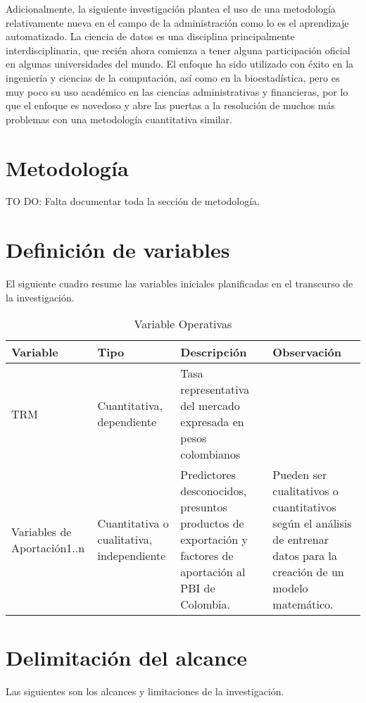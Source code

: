 Adicionalmente, la siguiente investigación plantea el uso de una metodología relativamente nueva en el campo de la administración como lo es el aprendizaje automatizado. La ciencia de datos es una disciplina principalmente interdisciplinaria, que recién ahora comienza a tener alguna participación oficial en algunas universidades del mundo. El enfoque ha sido utilizado con éxito en la ingeniería y ciencias de la computación, así como en la bioestadística, pero es muy poco su uso académico en las ciencias administrativas y financieras, por lo que el enfoque es novedoso y abre las puertas a la resolución de muchos más problemas con una metodología cuantitativa similar. 

\section{Metodología}
TO DO: Falta documentar toda la sección de metodología. 

\section{Definición de variables}
El siguiente cuadro resume las variables iniciales planificadas en el transcurso de la investigación.

\begin{table}[h]
\begin{tabular}{m{1.0in} m{1.0in} m{1.5in} m{1.5in}}
\textbf{Variable} & Tipo & Descripción & Observación \\ \hline
TRM & Cuantitativa, dependiente & Tasa representativa del mercado expresada en pesos colombianos &  \\ \hline
Variables de Aportación1..n & Cuantitativa o cualitativa, independiente & Predictores desconocidos, presuntos productos de exportación y factores de aportación al PBI de Colombia. & Pueden ser cualitativos o cuantitativos según el análisis de entrenar datos para la creación de un modelo matemático.
\end{tabular}

\caption{Variable Operativas}
\label{my-label}
\end{table}

\section{Delimitación del alcance}
Las siguientes son los alcances y limitaciones de la investigación. 

